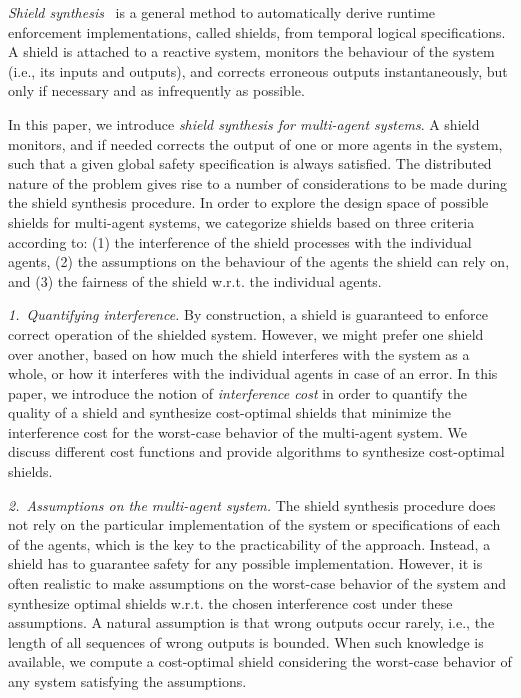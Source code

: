 \emph{Shield synthesis}~\cite{KonighoferABHKT17} is a general method to automatically derive runtime enforcement implementations, called shields,
from temporal logical specifications.
A shield is attached to a reactive system, monitors the behaviour of the system (i.e., its inputs and outputs), and corrects
erroneous outputs instantaneously, but only if necessary and as infrequently
as possible.


In this paper, we introduce \emph{shield synthesis for multi-agent systems}. A shield monitors, and if needed corrects the output of one or more agents in the system, such that a given global safety specification is always satisfied. The distributed nature of the problem gives rise to a number of considerations to be made during the shield synthesis procedure. In order to explore the design space of possible shields for multi-agent systems, we categorize shields based on three criteria according to:
(1) the interference of the shield processes with the individual agents,
(2) the assumptions on the behaviour of the agents the shield can rely on, and
(3) the fairness of the shield w.r.t. the individual agents.


\emph{1.\ Quantifying interference.}
By construction, a shield is guaranteed to enforce correct operation of the shielded system. However, we might prefer one shield over another, based on how much the shield interferes with the system as a whole, or how it interferes with the individual agents in case of an error. In this paper, we introduce the notion of  \emph{interference cost}
in order to quantify the quality of a shield
and synthesize cost-optimal shields that minimize the interference cost for the worst-case behavior of the multi-agent system.
We discuss different cost functions and provide algorithms to synthesize cost-optimal shields.

\emph{2.\ Assumptions on the multi-agent system.}
The shield synthesis procedure does not rely on the particular implementation of the system or specifications of each of the  agents, which is the key to the practicability of the approach. Instead, a shield has to guarantee safety for any possible implementation.
However, it is often realistic to make assumptions on the worst-case behavior of the system and  synthesize optimal shields w.r.t. the chosen interference cost under these assumptions. A natural assumption is that wrong outputs occur rarely, i.e., the length of all sequences of wrong outputs is bounded.
When such knowledge is available, we compute a cost-optimal shield considering the worst-case behavior of any system satisfying the assumptions.

